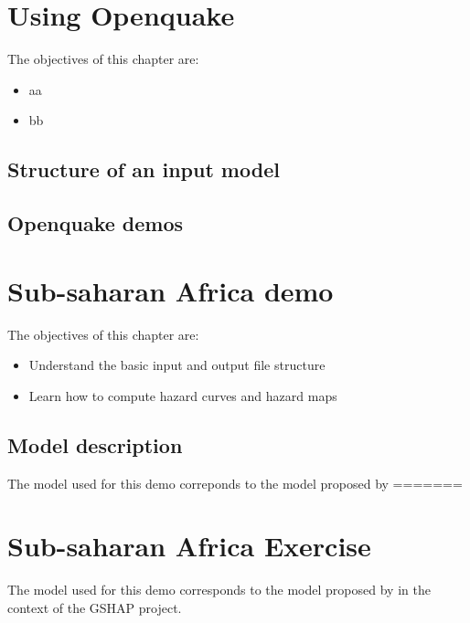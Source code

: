 \documentclass[11pt,a4paper,headings=small,dvips]{scrbook}
\newenvironment{myfancybox}{%
  \def\FrameCommand{\fboxsep=\FrameSep \fcolorbox{blue01}{honeydew}}%
  \color{black}\MakeFramed {\FrameRestore}}%
 {\endMakeFramed}
\begin{document}
\chapter{Using Openquake}
\begin{myfancybox}
The objectives of this chapter are:
\begin{itemize}
    \item aa
    \item bb
\end{itemize}
\end{myfancybox}
\section{Structure of an input model}
\section{Openquake demos}
\cleardoublepage
\chapter{Sub-saharan Africa demo}
\begin{myfancybox}
The objectives of this chapter are:
\begin{itemize}
    \item Understand the basic input and output file structure
    \item Learn how to compute hazard curves and hazard maps
\end{itemize}
\end{myfancybox}

\section{Model description}
The model used for this demo correponds to the model proposed by 
=======
\chapter{Sub-saharan Africa Exercise}
The model used for this demo corresponds to the model proposed by 
\citet{midzi1999} in the context of the GSHAP project.
\end{document}
